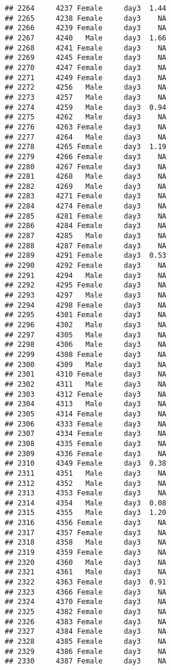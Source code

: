 \documentclass[
]{article}
\begin{document}
\begin{verbatim}
## 2264     4237 Female     day3  1.44
## 2265     4238 Female     day3    NA
## 2266     4239 Female     day3    NA
## 2267     4240   Male     day3  1.66
## 2268     4241 Female     day3    NA
## 2269     4245 Female     day3    NA
## 2270     4247 Female     day3    NA
## 2271     4249 Female     day3    NA
## 2272     4256   Male     day3    NA
## 2273     4257   Male     day3    NA
## 2274     4259   Male     day3  0.94
## 2275     4262   Male     day3    NA
## 2276     4263 Female     day3    NA
## 2277     4264   Male     day3    NA
## 2278     4265 Female     day3  1.19
## 2279     4266 Female     day3    NA
## 2280     4267 Female     day3    NA
## 2281     4268   Male     day3    NA
## 2282     4269   Male     day3    NA
## 2283     4271 Female     day3    NA
## 2284     4274 Female     day3    NA
## 2285     4281 Female     day3    NA
## 2286     4284 Female     day3    NA
## 2287     4285   Male     day3    NA
## 2288     4287 Female     day3    NA
## 2289     4291 Female     day3  0.53
## 2290     4292 Female     day3    NA
## 2291     4294   Male     day3    NA
## 2292     4295 Female     day3    NA
## 2293     4297   Male     day3    NA
## 2294     4298 Female     day3    NA
## 2295     4301 Female     day3    NA
## 2296     4302   Male     day3    NA
## 2297     4305   Male     day3    NA
## 2298     4306   Male     day3    NA
## 2299     4308 Female     day3    NA
## 2300     4309   Male     day3    NA
## 2301     4310 Female     day3    NA
## 2302     4311   Male     day3    NA
## 2303     4312 Female     day3    NA
## 2304     4313   Male     day3    NA
## 2305     4314 Female     day3    NA
## 2306     4333 Female     day3    NA
## 2307     4334 Female     day3    NA
## 2308     4335 Female     day3    NA
## 2309     4336 Female     day3    NA
## 2310     4349 Female     day3  0.38
## 2311     4351   Male     day3    NA
## 2312     4352   Male     day3    NA
## 2313     4353 Female     day3    NA
## 2314     4354   Male     day3  0.08
## 2315     4355   Male     day3  1.20
## 2316     4356 Female     day3    NA
## 2317     4357 Female     day3    NA
## 2318     4358   Male     day3    NA
## 2319     4359 Female     day3    NA
## 2320     4360   Male     day3    NA
## 2321     4361   Male     day3    NA
## 2322     4363 Female     day3  0.91
## 2323     4366 Female     day3    NA
## 2324     4370 Female     day3    NA
## 2325     4382 Female     day3    NA
## 2326     4383 Female     day3    NA
## 2327     4384 Female     day3    NA
## 2328     4385 Female     day3    NA
## 2329     4386 Female     day3    NA
## 2330     4387 Female     day3    NA

\end{verbatim}
\end{document}
